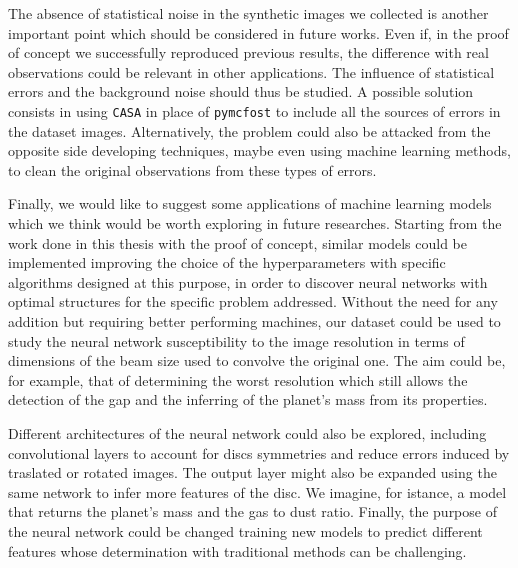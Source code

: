 \documentclass[a4paper,10pt]{report}
\begin{document}
The absence of statistical noise in the synthetic images we collected is another important point
which should be considered in future works. Even if, 
in the proof of concept we successfully reproduced previous results, the difference with real observations 
could be relevant in other applications.
The influence of statistical errors and the background noise should thus be studied.
A possible solution consists in using \lstinline{CASA} in place of \lstinline{pymcfost} to 
include all the sources of errors in the dataset images. Alternatively,
the problem could also be attacked from the opposite side developing techniques,
maybe even using machine learning methods, to clean the original observations from these types of errors.

Finally, we would like to suggest some applications of machine learning
models which we think would be worth exploring in future researches.
Starting from the work done in this thesis with the proof of concept, similar 
models could be implemented improving the choice of the hyperparameters with 
specific algorithms designed at this purpose, in order to discover neural networks
with optimal structures for the specific problem addressed.
Without the need for any addition but requiring better performing machines, our 
dataset could be used to study the neural network susceptibility to the image resolution in terms of dimensions of
the beam size used to convolve the original one. The aim could be, for example, that of determining the worst resolution which
still allows the detection of the gap and the inferring of the planet's mass from its properties.

Different architectures of the neural network could also be explored, including convolutional
layers to account for discs symmetries and reduce errors induced by traslated or rotated images.
The output layer might also be expanded using the same network to infer more features of the disc. We imagine, 
for istance, a model that returns the planet's mass and the gas to dust ratio. Finally, the purpose of the neural network
could be changed training new models to predict different features whose determination
with traditional methods can be challenging.

\end{document}
